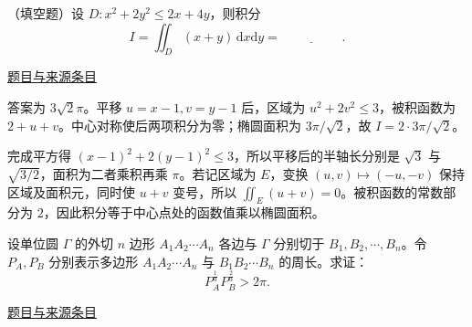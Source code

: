 \documentclass[12pt,fontset=fandol]{ctexart}
\begin{document}
\begin{example}[来源序号3]\label{ex:fin07-hi:3}\label{pr:fin07-hi:3}

（填空题）设 $D:x^{2}+2y^{2}\leq 2x+4y$，则积分
\[
I=\iint_{D}(x+y)\,\mathrm{d}x\mathrm{d}y=\underline{\hspace{2cm}}.
\]

\par\href{https://github.com/lzxcr/cmc-mathematics/blob/64916fa1fdbc3e444a652eca204d5669058ee321/src/problems/finals/07/03.md}{题目与来源条目}

\end{example}

\begin{solve}\label{ans:fin07-hi:3}

答案为 $3\sqrt2\pi$。平移 $u=x-1,v=y-1$ 后，区域为 $u^2+2v^2\leq3$，被积函数为 $2+u+v$。中心对称使后两项积分为零；椭圆面积为 $3\pi/\sqrt2$，故 $I=2\cdot3\pi/\sqrt2$。

完成平方得 $(x-1)^2+2(y-1)^2\le3$，所以平移后的半轴长分别是 $\sqrt3$ 与 $\sqrt{3/2}$，面积为二者乘积再乘 $\pi$。若记区域为 $E$，变换 $(u,v)\mapsto(-u,-v)$ 保持区域及面积元，同时使 $u+v$ 变号，所以 $\iint_E(u+v)=0$。被积函数的常数部分为 $2$，因此积分等于中心点处的函数值乘以椭圆面积。

\end{solve}

\begin{example}[来源序号7]\label{ex:fin07-hi:7}\label{pr:fin07-hi:7}

设单位圆 $\Gamma$ 的外切 $n$ 边形 $A_{1}A_{2}\cdots A_{n}$ 各边与 $\Gamma$ 分别切于 $B_{1},B_{2},\cdots,B_{n}$。令 $P_{A},P_{B}$ 分别表示多边形 $A_{1}A_{2}\cdots A_{n}$ 与 $B_{1}B_{2}\cdots B_{n}$ 的周长。求证：
\[
P_{A}^{\frac{1}{3}}P_{B}^{\frac{2}{3}}>2\pi.
\]

\par\href{https://github.com/lzxcr/cmc-mathematics/blob/64916fa1fdbc3e444a652eca204d5669058ee321/src/problems/finals/07/07.md}{题目与来源条目}

\end{example}
\end{document}
